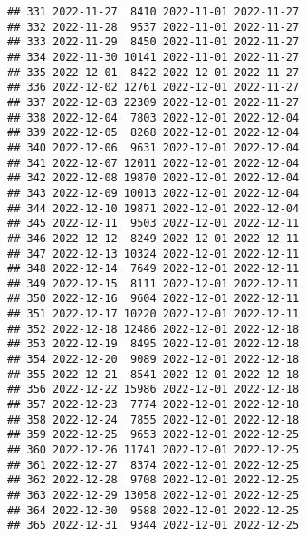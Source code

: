\documentclass[
]{article}
\begin{document}
\begin{verbatim}
## 331 2022-11-27  8410 2022-11-01 2022-11-27
## 332 2022-11-28  9537 2022-11-01 2022-11-27
## 333 2022-11-29  8450 2022-11-01 2022-11-27
## 334 2022-11-30 10141 2022-11-01 2022-11-27
## 335 2022-12-01  8422 2022-12-01 2022-11-27
## 336 2022-12-02 12761 2022-12-01 2022-11-27
## 337 2022-12-03 22309 2022-12-01 2022-11-27
## 338 2022-12-04  7803 2022-12-01 2022-12-04
## 339 2022-12-05  8268 2022-12-01 2022-12-04
## 340 2022-12-06  9631 2022-12-01 2022-12-04
## 341 2022-12-07 12011 2022-12-01 2022-12-04
## 342 2022-12-08 19870 2022-12-01 2022-12-04
## 343 2022-12-09 10013 2022-12-01 2022-12-04
## 344 2022-12-10 19871 2022-12-01 2022-12-04
## 345 2022-12-11  9503 2022-12-01 2022-12-11
## 346 2022-12-12  8249 2022-12-01 2022-12-11
## 347 2022-12-13 10324 2022-12-01 2022-12-11
## 348 2022-12-14  7649 2022-12-01 2022-12-11
## 349 2022-12-15  8111 2022-12-01 2022-12-11
## 350 2022-12-16  9604 2022-12-01 2022-12-11
## 351 2022-12-17 10220 2022-12-01 2022-12-11
## 352 2022-12-18 12486 2022-12-01 2022-12-18
## 353 2022-12-19  8495 2022-12-01 2022-12-18
## 354 2022-12-20  9089 2022-12-01 2022-12-18
## 355 2022-12-21  8541 2022-12-01 2022-12-18
## 356 2022-12-22 15986 2022-12-01 2022-12-18
## 357 2022-12-23  7774 2022-12-01 2022-12-18
## 358 2022-12-24  7855 2022-12-01 2022-12-18
## 359 2022-12-25  9653 2022-12-01 2022-12-25
## 360 2022-12-26 11741 2022-12-01 2022-12-25
## 361 2022-12-27  8374 2022-12-01 2022-12-25
## 362 2022-12-28  9708 2022-12-01 2022-12-25
## 363 2022-12-29 13058 2022-12-01 2022-12-25
## 364 2022-12-30  9588 2022-12-01 2022-12-25
## 365 2022-12-31  9344 2022-12-01 2022-12-25
\end{verbatim}
\end{document}

